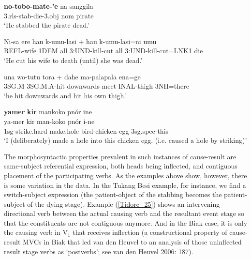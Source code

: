 \ea \label{TUKANG001a}
\gll \textbf{no-tobo-mate-'e} na sanggila \\
\acs{3}.\acs{rls}-stab-die-\acs{3}.\acs{obj} \acs{nom} pirate \\
\glft `He stabbed the pirate dead.' \\ 
\z
\xe

\ea \label{Makalero_47}
\gll Ni-sa ere hau k-umu-lasi + hau k-umu-lasi=ni umu \\
REFL-wife 1DEM all 3:UND-kill-cut all 3:UND-kill-cut=LNK1 die \\
\glft `He cut his wife to death (until) she was dead.’ \\ 
\z
\xe

\ea \label{Tidore_25}
\gll una wo-tutu tora + dahe ma-palapala ena=ge \\
3SG.M 3SG.M.A-hit downwards meet INAL-thigh 3NH=there \\
\glft `he hit downwards and hit his own thigh.' \\ 
\z
\xe

\ea \label{Biak002}
\gll \textbf{yamer} \textbf{kir} mankoko pnór ine \\
ya-mer kir man-koko pnór i-ne \\
\glc \acs{1}\acs{sg}-strike.hard make.hole bird-chicken egg \acs{3}\acs{sg}.\acs{spec}-this \\
\glft `I (deliberately) made a hole into this chicken egg. (i.e. caused a hole by striking)' \\ 
\z
\xe

The morphosyntactic properties prevalent in such instances of cause-result are same-subject referential expression, both heads being inflected, and contiguous placement of the participating verbs. As the examples above show, however, there is some variation in the data. In the Tukang Besi example, for instance, we find a switch-subject expression (the patient-object of the stabbing becomes the patient-subject of the dying stage). Example (\ref{Tidore_25}) shows an intervening directional verb between the actual causing verb and the resultant event stage so that the constituents are not contiguous anymore. And in the Biak case, it is only the causing verb in V$_1$ that receives inflection (a constructional property of cause-result MVCs in Biak that led van den Heuvel to an analysis of those uninflected result stage verbs as `postverbs'; see van den Heuvel 2006: 187).

